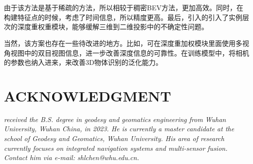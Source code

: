 \documentclass[12pt, twocolumn]{article}
\newcommand\normf{\fangsong}
\begin{document}
	\section{\normf{结论与展望}}
	由于该方法是基于稀疏的方法，所以相较于稠密BEV方法，更加高效。同时，在构建特征点的时候，考虑了时间信息，所以精度更高。最后，引入的引入了实例层次的深度重权重模块，能够缓解三维到二维投影中的不确定性问题。

	当然，该方案也存在一些待改进的地方。比如，可在深度重加权模块里面使用多视角视图中的双目视图信息，进一步改善深度信息的可靠性。在训练模型中，将相机的参数也纳入进来，来改善3D物体识别的泛化能力。
	
	
	
	
	\section*{ACKNOWLEDGMENT}
	\begin{tcolorbox}[colback=white,colframe=white!70!black,title={\bfseries Author Information}]
	\par\noindent
		\parbox[t]{\linewidth}{
	 \noindent{}
	 \emph{
	 received the B.S. degree in geodesy and geomatics engineering from Wuhan University, Wuhan China, in 2023.
	 He is currently a master candidate at the school of Geodesy and Geomatics, Wuhan University. His area of research currently focuses on integrated navigation systems and multi-sensor fusion.
	 Contact him via e-mail: shlchen@whu.edu.cn.
	 }}
	\end{tcolorbox}
		
		
\end{document}
